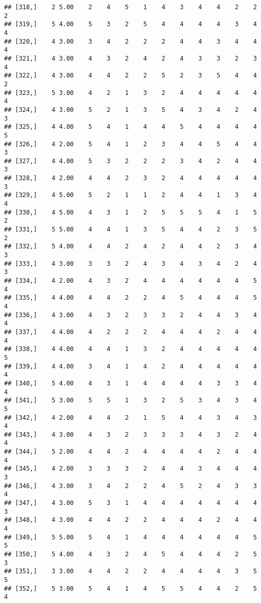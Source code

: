 \documentclass[]{article}
\begin{document}
\begin{verbatim}
## [318,]    2 5.00    2    4    5    1    4    3    4    4    2    2    2
## [319,]    5 4.00    5    3    2    5    4    4    4    4    3    4    4
## [320,]    4 3.00    3    4    2    2    2    4    4    3    4    4    4
## [321,]    4 3.00    4    3    2    4    2    4    3    3    2    3    4
## [322,]    4 3.00    4    4    2    2    5    2    3    5    4    4    2
## [323,]    5 3.00    4    2    1    3    2    4    4    4    4    4    4
## [324,]    4 3.00    5    2    1    3    5    4    3    4    2    4    3
## [325,]    4 4.00    5    4    1    4    4    5    4    4    4    4    5
## [326,]    4 2.00    5    4    1    2    3    4    4    5    4    4    3
## [327,]    4 4.00    5    3    2    2    2    3    4    2    4    4    3
## [328,]    4 2.00    4    4    2    3    2    4    4    4    4    4    3
## [329,]    4 5.00    5    2    1    1    2    4    4    1    3    4    4
## [330,]    4 5.00    4    3    1    2    5    5    5    4    1    5    2
## [331,]    5 5.00    4    4    1    3    5    4    4    2    3    5    2
## [332,]    5 4.00    4    4    2    4    2    4    4    2    3    4    3
## [333,]    4 3.00    3    3    2    4    3    4    3    4    2    4    3
## [334,]    4 2.00    4    3    2    4    4    4    4    4    4    5    4
## [335,]    4 4.00    4    4    2    2    4    5    4    4    4    5    4
## [336,]    4 3.00    4    3    2    3    3    2    4    4    3    4    4
## [337,]    4 4.00    4    2    2    2    4    4    4    2    4    4    4
## [338,]    4 4.00    4    4    1    3    2    4    4    4    4    4    5
## [339,]    4 4.00    3    4    1    4    2    4    4    4    4    4    4
## [340,]    5 4.00    4    3    1    4    4    4    4    3    3    4    4
## [341,]    5 3.00    5    5    1    3    2    5    3    4    3    4    5
## [342,]    4 2.00    4    4    2    1    5    4    4    3    4    3    4
## [343,]    4 3.00    4    3    2    3    3    3    4    3    2    4    4
## [344,]    5 2.00    4    4    2    4    4    4    4    2    4    4    4
## [345,]    4 2.00    3    3    3    2    4    4    3    4    4    4    3
## [346,]    4 3.00    3    4    2    2    4    5    2    4    3    3    4
## [347,]    4 3.00    5    3    1    4    4    4    4    4    4    4    3
## [348,]    4 3.00    4    4    2    2    4    4    4    2    4    4    4
## [349,]    5 5.00    5    4    1    4    4    4    4    4    4    5    5
## [350,]    5 4.00    4    3    2    4    5    4    4    4    2    5    3
## [351,]    3 3.00    4    4    2    2    4    4    4    4    3    5    5
## [352,]    5 3.00    5    4    1    4    5    5    4    4    2    5    4

\end{verbatim}
\end{document}
